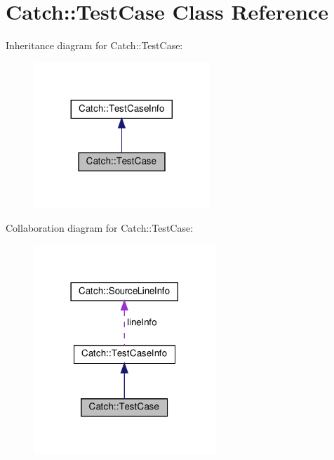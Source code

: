 \hypertarget{classCatch_1_1TestCase}{}\section{Catch\+::Test\+Case Class Reference}
\label{classCatch_1_1TestCase}


Inheritance diagram for Catch\+::Test\+Case\+:
\nopagebreak
\begin{figure}[H]
\begin{center}
\leavevmode
\includegraphics[width=188pt]{classCatch_1_1TestCase__inherit__graph}
\end{center}
\end{figure}


Collaboration diagram for Catch\+::Test\+Case\+:
\nopagebreak
\begin{figure}[H]
\begin{center}
\leavevmode
\includegraphics[width=194pt]{classCatch_1_1TestCase__coll__graph}
\end{center}
\end{figure}
